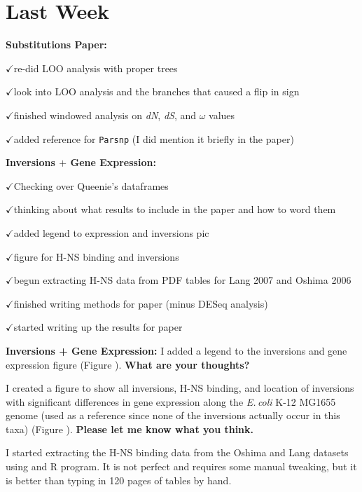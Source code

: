 \documentclass[12pt]{article}
\newcommand{\ecol}{\textit{E.\,coli}\xspace}
\newcommand{\ch}{$\checkmark$}
\newcommand{\dn}{\textit{dN}\xspace}
\newcommand{\ds}{\textit{dS}\xspace}
\begin{document}

	
\section*{Last Week}



\textbf{Substitutions Paper:}

\ch re-did LOO analysis with proper trees

\ch look into LOO analysis and the branches that caused a flip in sign

\ch finished windowed analysis on \dn, \ds, and $\omega$ values

\ch added reference for \texttt{Parsnp} (I did mention it briefly in the paper)


\textbf{Inversions $+$ Gene Expression:}

\ch Checking over Queenie's dataframes

\ch thinking about what results to include in the paper and how to word them

\ch added legend to expression and inversions pic

\ch figure for H-NS binding and inversions

\ch begun extracting H-NS data from PDF tables for Lang 2007 and Oshima 2006

\ch finished writing methods for paper (minus DESeq analysis)

\ch started writing up the results for paper


\bigskip

\textbf{Inversions + Gene Expression:}
I added a legend to the inversions and gene expression figure (Figure ). \textbf{What are your thoughts?}


I created a figure to show all inversions, H-NS binding, and location of inversions with significant differences in gene expression along the \ecol K-12 MG1655 genome (used as a reference since none of the inversions actually occur in this taxa) (Figure ).
\textbf{Please let me know what you think.}

I started extracting the H-NS binding data from the Oshima and Lang datasets using and R program. It is not perfect and requires some manual tweaking, but it is better than typing in 120 pages of tables by hand.
\end{document}
